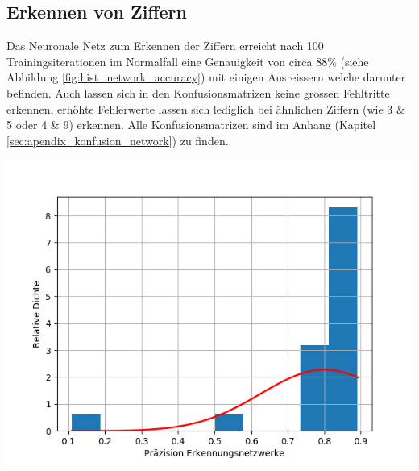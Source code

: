 \documentclass[Interploate_hadwritten_Digits.tex]{subfiles}
\begin{document}
	\subsection{Erkennen von Ziffern}
	Das Neuronale Netz zum Erkennen der Ziffern erreicht nach 100 Trainingsiterationen im Normalfall eine Genauigkeit von circa 88\% (siehe Abbildung \ref{fig:hist_network_accuracy}) mit einigen Ausreissern welche darunter befinden. Auch lassen sich in den Konfusionsmatrizen keine grossen Fehltritte erkennen, erhöhte Fehlerwerte lassen sich lediglich bei ähnlichen Ziffern (wie 3 \& 5 oder 4 \& 9) erkennen. Alle Konfusionsmatrizen sind im Anhang (Kapitel \ref{sec:apendix_konfusion_network}) zu finden.
	\begin{Figure}
		\centering
		\includegraphics[width=\linewidth]{img/results/histogram_network_accuracy.png}
		\label{fig:hist_network_accuracy}
	\end{Figure}
\end{document}
